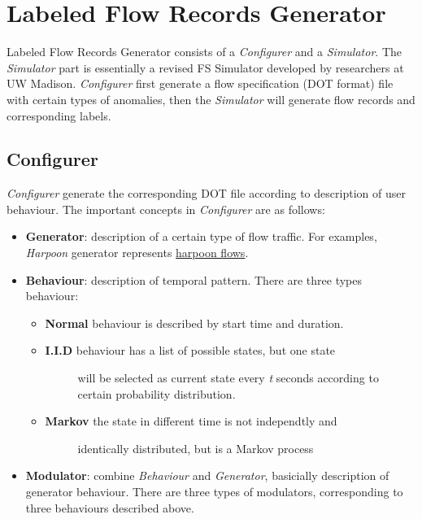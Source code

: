 \documentclass[letterpaper,10pt,english]{sphinxmanual}
\begin{document}
\section{Labeled Flow Records Generator}
\label{index:labeled-flow-records-generator}
Labeled Flow Records Generator consists of a \emph{Configurer} and a \emph{Simulator}.
The \emph{Simulator} part is essentially a revised FS Simulator developed by
researchers at UW Madison. \emph{Configurer} first generate a flow specification (DOT
format) file with certain types of anomalies, then the \emph{Simulator} will generate
flow records and corresponding labels.


\subsection{Configurer}
\label{index:configurer}
\emph{Configurer} generate the corresponding DOT file according to description of user
behaviour. The important concepts in \emph{Configurer} are as follows:
\begin{itemize}
\item {} 
\textbf{Generator}: description of a certain type of flow traffic. For
examples, \emph{Harpoon} generator represents \href{http://cs.colgate.edu/~jsommers/harpoon/}{harpoon flows}.

\item {} 
\textbf{Behaviour}: description of temporal pattern. There are three types
behaviour:
\begin{itemize}
\item {} 
\textbf{Normal} behaviour is described by start time and duration.

\item {} \begin{description}
\item[{\textbf{I.I.D} behaviour has a list of possible states, but one state}] \leavevmode
will be selected as current state every \emph{t} seconds
according to certain probability distribution.

\end{description}

\item {} \begin{description}
\item[{\textbf{Markov} the state in different time is not independtly and}] \leavevmode
identically distributed,  but is a Markov process

\end{description}

\end{itemize}

\item {} 
\textbf{Modulator}: combine \emph{Behaviour} and \emph{Generator}, basicially description
of generator behaviour. There are three types of modulators, corresponding
to three behaviours described above.

\end{itemize}
\end{document}
